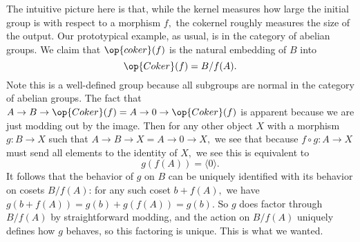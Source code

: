 The intuitive picture here is that, while the kernel measures how large the initial group is with respect to a morphism $f,$ the cokernel roughly measures the size of the output. Our prototypical example, as usual, is in the category of abelian groups. We claim that $\op{coker}(f)$ is the natural embedding of $B$ into
\[\op{Coker}(f)=B/f(A).\]
Note this is a well-defined group because all subgroups are normal in the category of abelian groups. The fact that $A\to B\to\op{Coker}(f)=A\to0\to\op{Coker}(f)$ is apparent because we are just modding out by the image. Then for any other object $X$ with a morphism $g:B\to X$ such that $A\to B\to X=A\to0\to X,$ we see that because $f\circ g:A\to X$ must send all elements to the identity of $X,$ we see this is equivalent to
\[g(f(A))=\langle0\rangle.\]
It follows that the behavior of $g$ on $B$ can be uniquely identified with its behavior on cosets $B/f(A)$: for any such coset $b+f(A),$ we have $g(b+f(A))=g(b)+g(f(A))=g(b).$ So $g$ does factor through $B/f(A)$ by straightforward modding, and the action on $B/f(A)$ uniquely defines how $g$ behaves, so this factoring is unique. This is what we wanted.

